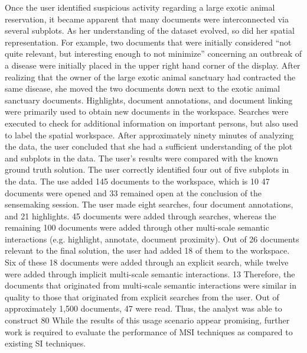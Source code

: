 \documentclass[journal]{vgtc}                %
\begin{document}
Once the user identified suspicious activity regarding a large exotic animal reservation, it became apparent that many documents were interconnected via several subplots.
As her understanding of the dataset evolved, so did her spatial representation.
For example, two documents that were initially considered “not quite relevant, but interesting enough to not minimize” concerning an outbreak of a disease were initially placed in the upper right hand corner of the display.
After realizing that the owner of the large exotic animal sanctuary had contracted the same disease, she moved the two documents down next to the exotic animal sanctuary documents.
Highlights, document annotations, and document linking were primarily used to obtain new documents in the workspace.
Searches were executed to check for additional information on important persons, but also used to label the spatial workspace.
After approximately ninety minutes of analyzing the data, the user concluded that she had a sufficient understanding of the plot and subplots in the data.
The user’s results were compared with the known ground truth solution.
The user correctly identified four out of five subplots in the data.
The use added 145 documents to the workspace, which is 10%
47 documents were opened and 33 remained open at the conclusion of the sensemaking session.
The user made eight searches, four document annotations, and 21 highlights.
45 documents were added through searches, whereas the remaining 100 documents were added through other multi-scale semantic interactions (e.g. highlight, annotate, document proximity).
Out of 26 documents relevant to the final solution, the user had added 18 of them to the workspace.
Six of these 18 documents were added through an explicit search, while twelve were added through implicit multi-scale semantic interactions.
13%
Therefore, the documents that originated from multi-scale semantic interactions were similar in quality to those that originated from explicit searches from the user.
Out of approximately 1,500 documents, 47 were read.
Thus, the analyst was able to construct 80%
While the results of this usage scenario appear promising, further work is required to evaluate the performance of MSI techniques as compared to existing SI techniques.
\end{document}
